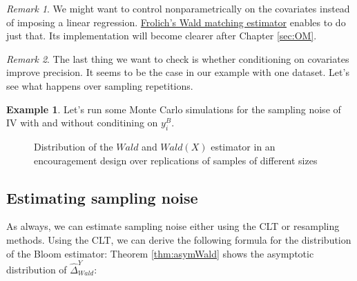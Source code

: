 \documentclass[
]{book}
\theoremstyle{definition}
\theoremstyle{definition}
\newtheorem{example}{Example}[chapter]
\theoremstyle{definition}
\theoremstyle{definition}
\theoremstyle{remark}
\newtheorem*{remark}{Remark}
\begin{document}
\begin{remark}
\iffalse{} {Remark. } \fi{}We might want to control nonparametrically on the covariates instead of imposing a linear regression.
\href{https://www.sciencedirect.com/science/article/abs/pii/S0304407606001023}{Frolich's Wald matching estimator} enables to do just that.
Its implementation will become clearer after Chapter \ref{sec:OM}.
\end{remark}

\begin{remark}
\iffalse{} {Remark. } \fi{}The last thing we want to check is whether conditioning on covariates improve precision.
It seems to be the case in our example with one dataset.
Let's see what happens over sampling repetitions.
\end{remark}

\begin{example}
\protect\hypertarget{exm:unnamed-chunk-130}{}{\label{exm:unnamed-chunk-130} }Let's run some Monte Carlo simulations for the sampling noise of IV with and without conditining on \(y_i^B\).
\end{example}

\begin{figure}[htbp]

{\centering {}

}

\caption{Distribution of the $Wald$ and $Wald(X)$ estimator in an encouragement design over replications of samples of different sizes}\label{fig:MonteCarloHistEncourage}
\end{figure}

\hypertarget{estimating-sampling-noise-3}{%
\subsection{Estimating sampling noise}\label{estimating-sampling-noise-3}}

As always, we can estimate sampling noise either using the CLT or resampling methods.
Using the CLT, we can derive the following formula for the distribution of the Bloom estimator:
Theorem \ref{thm:asymWald} shows the asymptotic distribution of \(\hat{\Delta}^Y_{Wald}\):
\end{document}
